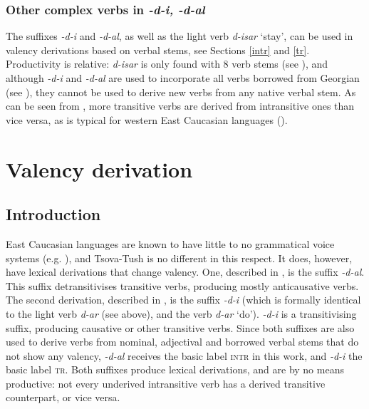 \subsubsection{Other complex verbs in \textit{-d-i, -d-al}}


The suffixes \textit{-d-i} and \textit{-d-al}, as well as the light verb \textit{d-isar} `stay', can be used in valency derivations based on verbal stems, see Sections \ref{intr} and \ref{tr}. Productivity is relative: \textit{d-isar} is only found with 8 verb stems (see ), and although \textit{-d-i} and \textit{-d-al} are used to incorporate all verbs borrowed from Georgian (see ), they cannot be used to derive new verbs from any native verbal stem. As can be seen from , more transitive verbs are derived from intransitive ones than vice versa, as is typical for western East Caucasian languages (\cite{nichols13}).


\section{Valency derivation} \label{verbderivproper}
\subsection{Introduction} \label{valintro}

East Caucasian languages are known to have little to no grammatical voice systems (e.g. \cites[]{comrie2000tsezval}), and Tsova-Tush is no different in this respect. It does, however, have lexical derivations that change valency. One, described in , is the suffix \textit{-d-al}. This suffix detransitivises transitive verbs, producing mostly anticausative verbs. The second derivation, described in , is the suffix \textit{-d-i} (which is formally identical to the light verb \textit{d-ar} (see  above), and the verb \textit{d-ar} `do'). \textit{-d-i} is a transitivising suffix, producing causative or other transitive verbs.  Since both suffixes are also used to derive verbs from nominal, adjectival and borrowed verbal stems that do not show any valency, \textit{-d-al} receives the basic label \textsc{intr} in this work, and \textit{-d-i} the basic label \textsc{tr}. Both suffixes produce lexical derivations, and are by no means productive: not every underived intransitive verb has a derived transitive counterpart, or vice versa.


